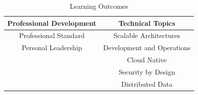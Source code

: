\documentclass{article}
\begin{document}
    \begin{table}[h!]
        \centering
        \begin{tabular}{|c|c|}
             \hline \textbf{Professional Development} & \textbf{Technical Topics} \\
             \hline Professional Standard & Scalable Architectures \\
             \hline Personal Leadership & Development and Operations \\
             \hline & Cloud Native \\
             \hline & Security by Design \\
             \hline & Distributed Data \\
             \hline 
        \end{tabular}
        \caption{Learning Outcomes}
        \label{tab:learning-outcomes}
    \end{table}

    \newpage
    \printbibliography
\end{document}
